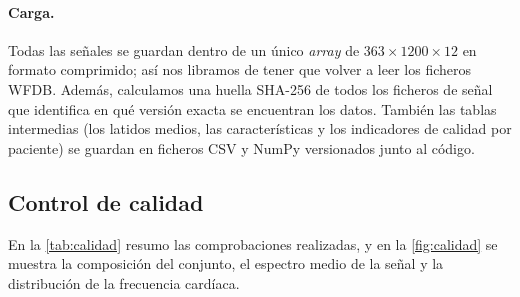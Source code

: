 \paragraph{Carga.} Todas las señales se guardan dentro de un único \emph{array} de $363 \times 1200 \times 12$ en formato comprimido; así nos libramos de tener que volver a leer los ficheros WFDB. Además, calculamos una huella SHA-256 de todos los ficheros de señal que identifica en qué versión exacta se encuentran los datos. También las tablas intermedias (los latidos medios, las características y los indicadores de calidad por paciente) se guardan en ficheros CSV y NumPy versionados junto al código.

\subsection{Control de calidad}\label{sec:calidad}

En la \cref{tab:calidad} resumo las comprobaciones realizadas, y en la \cref{fig:calidad} se muestra la composición del conjunto, el espectro medio de la señal y la distribución de la frecuencia cardíaca.

